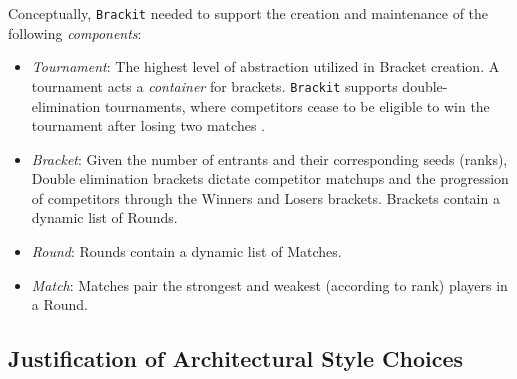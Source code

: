 \documentclass{article}
\begin{document}
Conceptually, \texttt{Brackit} needed to support the creation and maintenance of the following \textit{components}:
\begin{itemize}
    \item{\textit{Tournament}: The highest level of abstraction utilized in Bracket creation. A tournament acts a \textit{container} for brackets. \texttt{Brackit} supports double-elimination tournaments, where competitors cease to be eligible to win the tournament after losing two matches \cite{wiki:det}.}
    \item{\textit{Bracket}: Given the number of entrants and their corresponding seeds (ranks), 
    Double elimination brackets dictate competitor matchups and the progression of competitors through the Winners and Losers brackets. 
    Brackets contain 
    a dynamic list of Rounds. }
    \item{\textit{Round}: Rounds contain a dynamic list of Matches.}
    \item{\textit{Match}: Matches pair the strongest and weakest (according to rank) players in a Round.}
\end{itemize}  
    
\subsection{Justification of Architectural Style Choices}
\end{document}
